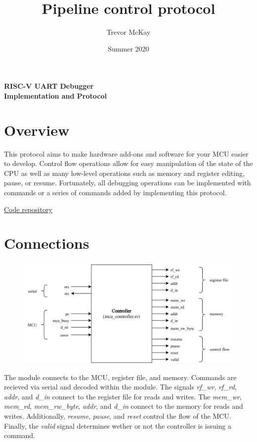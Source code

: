 \documentclass[10pt,a4paper]{article}
\title{Pipeline control protocol}
\author{Trevor McKay}
\date{Summer 2020}
\begin{document}
\begin{center}
    \Large\textbf{RISC-V UART Debugger\\Implementation and Protocol}
\end{center}

\section{Overview}

This protocol aims to make hardware add-ons and software for your MCU easier to develop. Control flow operations
allow for easy manipulation of the state of the CPU as well as many low-level operations such
as memory and register editing, pause, or resume. Fortunately, all debugging operations can be
implemented with commands or a series of commands added by implementing this
protocol.

\medskip
\noindent\underline{\href{https://github.com/trmckay/riscv-uart-debugger}{Code repository}}

\section{Connections}

\begin{figure}[H]
    \includegraphics[width=\textwidth]{blackbox}
\end{figure}
\medskip

The module connects to the MCU, register file, and memory. Commands are recieved via serial
and decoded within the module. The signals \emph{rf\_wr}, \emph{rf\_rd}, \emph{addr}, and
\emph{d\_in} connect to the register file for reads and writes. The \emph{mem\_wr},
\emph{mem\_rd}, \emph{mem\_rw\_byte}, \emph{addr}, and \emph{d\_in} connect to the memory
for reads and writes. Additionally, \emph{resume}, \emph{pause}, and \emph{reset} control
the flow of the MCU\@. Finally, the \emph{valid} signal determines wether or not the controller
is issuing a command.
\end{document}
